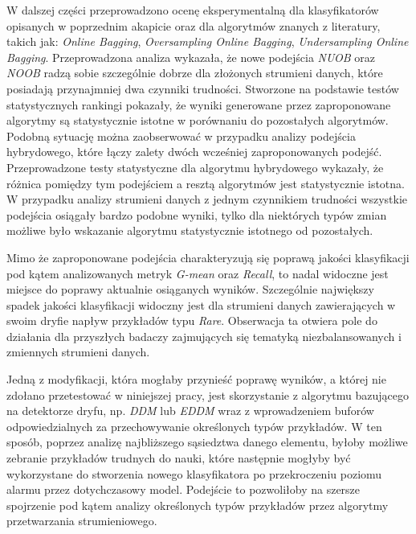 W dalszej części przeprowadzono ocenę eksperymentalną dla klasyfikatorów opisanych w poprzednim akapicie oraz dla algorytmów znanych z literatury, takich jak: \textit{Online Bagging}, \textit{Oversampling Online Bagging}, \textit{Undersampling Online Bagging}. Przeprowadzona analiza wykazała, że nowe podejścia \textit{NUOB} oraz \textit{NOOB} radzą sobie szczególnie dobrze dla złożonych strumieni danych, które posiadają przynajmniej dwa czynniki trudności. Stworzone na podstawie testów statystycznych rankingi pokazały, że wyniki generowane przez zaproponowane algorytmy są statystycznie istotne w porównaniu do pozostałych algorytmów. Podobną sytuację można zaobserwować w przypadku analizy podejścia hybrydowego, które łączy zalety dwóch wcześniej zaproponowanych podejść. Przeprowadzone testy statystyczne dla algorytmu hybrydowego wykazały, że różnica pomiędzy tym podejściem a resztą algorytmów jest statystycznie istotna. W przypadku analizy strumieni danych z jednym czynnikiem trudności wszystkie podejścia osiągały bardzo podobne wyniki, tylko dla niektórych typów zmian możliwe było wskazanie algorytmu statystycznie istotnego od pozostałych.

Mimo że zaproponowane podejścia charakteryzują się poprawą jakości klasyfikacji pod kątem analizowanych metryk \textit{G-mean} oraz \textit{Recall}, to nadal widoczne jest miejsce do poprawy aktualnie osiąganych wyników. Szczególnie największy spadek jakości klasyfikacji widoczny jest dla strumieni danych zawierających w swoim dryfie napływ przykładów typu \textit{Rare}. Obserwacja ta otwiera pole do działania dla przyszłych badaczy zajmujących się tematyką niezbalansowanych i zmiennych strumieni danych.

Jedną z modyfikacji, która mogłaby przynieść poprawę wyników, a której nie zdołano przetestować w niniejszej pracy, jest skorzystanie z algorytmu bazującego na detektorze dryfu, np. \textit{DDM} lub \textit{EDDM} wraz z wprowadzeniem buforów odpowiedzialnych za przechowywanie określonych typów przykładów. W ten sposób, poprzez analizę najbliższego sąsiedztwa danego elementu, byłoby możliwe zebranie przykładów trudnych do nauki, które następnie mogłyby być wykorzystane do stworzenia nowego klasyfikatora po przekroczeniu poziomu alarmu przez dotychczasowy model. Podejście to pozwoliłoby na szersze spojrzenie pod kątem analizy określonych typów przykładów przez algorytmy przetwarzania strumieniowego.